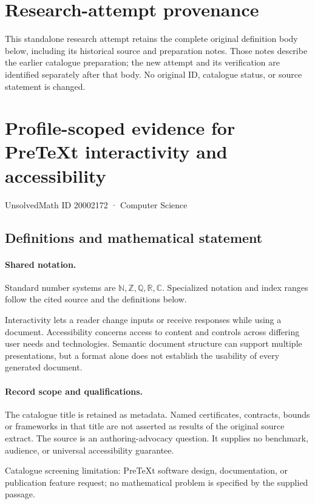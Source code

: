 \documentclass[11pt]{article}
\begin{document}
\section*{Research-attempt provenance}
This standalone research attempt retains the complete original definition body below,
including its historical source and preparation notes. Those notes describe the
earlier catalogue preparation; the new attempt and its verification are identified
separately after that body. No original ID, catalogue status, or source statement is changed.

\section{Profile-scoped evidence for PreTeXt interactivity and accessibility}\label{20002172}
{\small UnsolvedMath ID 20002172 · Computer Science}
\subsection{Definitions and mathematical statement}

\paragraph{Shared notation.}Standard number systems are $\mathbb N,\mathbb Z,\mathbb Q,\mathbb R,\mathbb C$. Specialized notation and index ranges follow the cited source and the definitions below.


Interactivity lets a reader change inputs or receive responses while using a document. Accessibility concerns access to content and controls across differing user needs and technologies. Semantic document structure can support multiple presentations, but a format alone does not establish the usability of every generated document.
\paragraph{Record scope and qualifications.}
The catalogue title is retained as metadata. Named certificates, contracts, bounds or frameworks in that title are not asserted as results of the original source extract.
The source is an authoring-advocacy question. It supplies no benchmark, audience, or universal accessibility guarantee.

Catalogue screening limitation: PreTeXt software design, documentation, or publication feature request; no mathematical problem is specified by the supplied passage.
\end{document}
